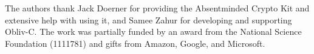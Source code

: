 \documentclass[sigconf]{acmart}
\begin{document}


\maketitle






%




\begin{acks}
The authors thank Jack Doerner for providing the Absentminded Crypto Kit and extensive help with using it, and Samee Zahur for developing and supporting Obliv-C.  The work was partially funded by an award from the National Science Foundation (1111781) and gifts from Amazon, Google, and Microsoft.
\end{acks}

\appendix





\end{document}

